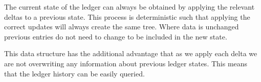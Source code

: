 The current state of the ledger can always be obtained by applying the relevant deltas to a previous state. This process is deterministic such that applying the correct updates will always create the same tree. Where data is unchanged previous entries do not need to change to be included in the new state.

This data structure has the additional advantage that as we apply each delta we are not overwriting any information about previous ledger states. This means that the ledger history can be easily queried.
